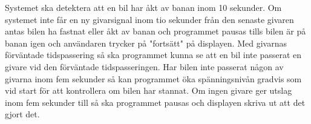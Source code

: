 Systemet ska detektera att en bil har åkt av banan inom 10 sekunder. Om systemet
inte får en ny givarsignal inom tio sekunder från den senaste givaren antas bilen ha
fastnat eller åkt av banan och programmet pausas tills bilen är på banan igen
och användaren trycker på "fortsätt" på displayen. Med givarnas förväntade tidspassering så ska programmet kunna se att en bil inte passerat en givare vid den förväntade tidspasseringen. Har bilen inte passerat någon av givarna inom fem sekunder så kan programmet öka spänningsnivån gradvis som vid start för att kontrollera om bilen har stannat. Om ingen givare ger utslag inom fem sekunder till så ska programmet pausas och displayen skriva ut att det gjort det.

